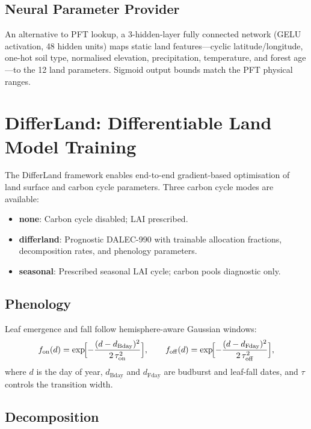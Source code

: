\documentclass[11pt,twoside]{report}
\begin{document}
\subsection{Neural Parameter Provider}

An alternative to PFT lookup, a 3-hidden-layer fully connected network (GELU activation, 48 hidden units) maps static land features---cyclic latitude/longitude, one-hot soil type, normalised elevation, precipitation, temperature, and forest age---to the 12 land parameters.  Sigmoid output bounds match the PFT physical ranges.


\section{DifferLand: Differentiable Land Model Training}
\label{sec:differland}

The DifferLand framework enables end-to-end gradient-based optimisation of land surface and carbon cycle parameters.  Three carbon cycle modes are available:
\begin{itemize}[nosep]
  \item \textbf{none}: Carbon cycle disabled; LAI prescribed.
  \item \textbf{differland}: Prognostic DALEC-990 with trainable allocation fractions, decomposition rates, and phenology parameters.
  \item \textbf{seasonal}: Prescribed seasonal LAI cycle; carbon pools diagnostic only.
\end{itemize}

\subsection{Phenology}

Leaf emergence and fall follow hemisphere-aware Gaussian windows:
\begin{equation}
  f_{\mathrm{on}}(d) = \exp\!\Bigl[-\frac{(d-d_{\mathrm{Bday}})^2}{2\,\tau_{\mathrm{on}}^2}\Bigr],
  \qquad
  f_{\mathrm{off}}(d) = \exp\!\Bigl[-\frac{(d-d_{\mathrm{Fday}})^2}{2\,\tau_{\mathrm{off}}^2}\Bigr],
\end{equation}
where $d$ is the day of year, $d_{\mathrm{Bday}}$ and $d_{\mathrm{Fday}}$ are budburst and leaf-fall dates, and $\tau$ controls the transition width.

\subsection{Decomposition}
\end{document}
